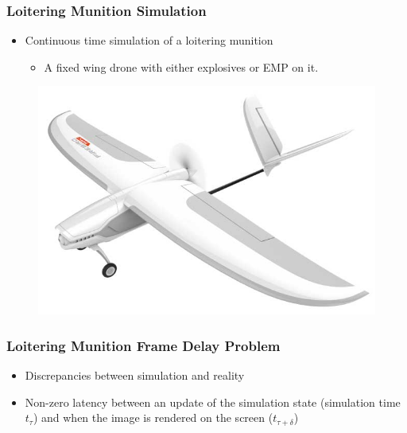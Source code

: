 \documentclass[aspectratio=169]{beamer}
\begin{document}
\begin{frame}
  \frametitle{Loitering Munition Simulation}
  \begin{itemize}
  \item Continuous time simulation of a loitering munition
    \begin{itemize}
    \item A fixed wing drone with either explosives or EMP on it.
    \end{itemize}
  \end{itemize}
    \begin{figure}
      \includegraphics[width=\textwidth]{Firebird-FPV-Fixed-Wing-Drone.jpg}
    \end{figure}
    
\end{frame}

\begin{frame}
  \frametitle{Loitering Munition Frame Delay Problem}
  \begin{itemize}
  \item Discrepancies between simulation and reality
  \item Non-zero latency between an update of the simulation state (simulation time $t_{\tau}$) and when the image is rendered on the screen ($t_{\tau+\delta}$)
  \end{itemize}
\end{frame}
\end{document}
